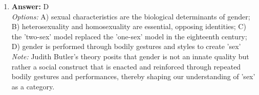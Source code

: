 \documentclass[12pt]{article}
\begin{document}
\begin{enumerate}[label=\arabic*.]
\\ \textit{Note:} The market model of state welfare emphasizes the role of individual responsibility in securing welfare through private purchases and aims to supplement this with targeted means-tested benefits for those who cannot afford to do so, reflecting a belief in market efficiency and personal choice in welfare provision.
\item \textbf{Answer:} D
\\ \textit{Options:} A) sexual characteristics are the biological determinants of gender; B) heterosexuality and homosexuality are essential, opposing identities; C) the 'two-sex' model replaced the 'one-sex' model in the eighteenth century; D) gender is performed through bodily gestures and styles to create 'sex'
\\ \textit{Note:} Judith Butler's theory posits that gender is not an innate quality but rather a social construct that is enacted and reinforced through repeated bodily gestures and performances, thereby shaping our understanding of 'sex' as a category.
\end{enumerate}
\end{document}
